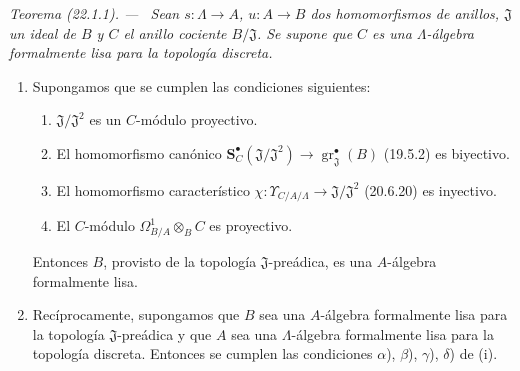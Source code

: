 \documentclass[10pt,oneside]{book}
\makeatletter
\newcommand{\setmanualcurrentlabel}[1]{\def\@currentlabel{#1}}
\newenvironment{theorem}[1][]{%
  \setmanualcurrentlabel{#1}\par\medskip\noindent\itshape Teorema (#1). ---\ }{\par}
\makeatother
\begin{document}
\begin{theorem}[22.1.1]
\label{0.22.1.1-es}
Sean $s:\Lambda\to A$, $u:A\to B$ dos homomorfismos de anillos,
$\mathfrak J$ un ideal de $B$ y $C$ el anillo cociente $B/\mathfrak J$. Se
supone que $C$ es una $\Lambda$-álgebra formalmente lisa para la topología
discreta.
\begin{enumerate}
  \item[\textup{(i)}] Supongamos que se cumplen las condiciones siguientes:
  \begin{enumerate}
    \item[\textup{$\alpha$)}] $\mathfrak J/\mathfrak J^2$ es un $C$-módulo proyectivo.
    \item[\textup{$\beta$)}] El homomorfismo canónico
    $\mathbf S_C^\bullet(\mathfrak J/\mathfrak J^2)\to
    \operatorname{gr}_{\mathfrak J}^\bullet(B)$ \textup{(19.5.2)} es biyectivo.
    \item[\textup{$\gamma$)}] El homomorfismo característico
    $\chi:\Upsilon_{C/A/\Lambda}\to\mathfrak J/\mathfrak J^2$ \textup{(20.6.20)}
    es inyectivo.
    \item[\textup{$\delta$)}] El $C$-módulo
    $\Omega^1_{B/A}\otimes_BC$ es proyectivo.
  \end{enumerate}
  Entonces $B$, provisto de la topología $\mathfrak J$-preádica, es una
  $A$-álgebra formalmente lisa.

  \item[\textup{(ii)}] Recíprocamente, supongamos que $B$ sea una $A$-álgebra
  formalmente lisa para la topología $\mathfrak J$-preádica y que $A$ sea una
  $\Lambda$-álgebra formalmente lisa para la topología discreta. Entonces se
  cumplen las condiciones \textup{$\alpha$), $\beta$), $\gamma$), $\delta$)} de \textup{(i)}.
\end{enumerate}
\end{theorem}
\end{document}
